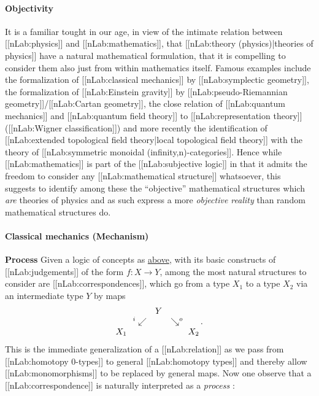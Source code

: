 \documentclass[12pt,titlepage]{article}
\def\mathllap{\mathpalette\mathllapinternal}
\def\mathrlap{\mathpalette\mathrlapinternal}
\def\mathllapinternal#1#2{\llap{$\mathsurround=0pt#1{#2}$}}
\def\mathrlapinternal#1#2{\rlap{$\mathsurround=0pt#1{#2}$}}
\newcommand{\itexarray}[1]{\begin{matrix}#1\end{matrix}}
\theoremstyle{plain}
\theoremstyle{definition}
\theoremstyle{remark}
\begin{document}
\hypertarget{objectivity}{}\paragraph*{{Objectivity}}\label{objectivity}
It is a familiar tought in our age, in view of the intimate relation between [[nLab:physics]] and [[nLab:mathematics]], that [[nLab:theory (physics)|theories of physics]] have a natural mathematical formulation, that it is compelling to consider them also just from within mathematics itself. Famous examples include the formalization of [[nLab:classical mechanics]] by [[nLab:symplectic geometry]], the formalization of [[nLab:Einstein gravity]] by [[nLab:pseudo-Riemannian geometry]]/[[nLab:Cartan geometry]], the close relation of [[nLab:quantum mechanics]] and [[nLab:quantum field theory]] to [[nLab:representation theory]] ([[nLab:Wigner classification]]) and more recently the identification of [[nLab:extended topological field theory|local topological field theory]] with the theory of [[nLab:symmetric monoidal (infinity,n)-categories]].
Hence while [[nLab:mathematics]] is part of the [[nLab:subjective logic]] in that it admits the freedom to consider any [[nLab:mathematical structure]] whatsoever, this suggests to identify among these the ``objective'' mathematical structures which \emph{are} theories of physics and as such express a more \emph{objective reality} than random mathematical structures do.
\hypertarget{classical_mechanics_mechanism}{}\paragraph*{{Classical mechanics (Mechanism)}}\label{classical_mechanics_mechanism}
\textbf{Process}
Given a logic of concepts as \hyperlink{ConceptFormalization}{above}, with its basic constructs of [[nLab:judgements]] of the form $f \colon X \to Y$, among the most natural structures to consider are [[nLab:correspondences]], which go from a type $X_1$ to a type $X_2$ via an intermediate type $Y$ by maps
\begin{displaymath}
\itexarray{
    && Y
    \\
    & {}^{\mathllap{i}}\swarrow && \searrow^{\mathrlap{o}}
    \\
    X_1 && && X_2
  }
  \,.
\end{displaymath}
This is the immediate generalization of a [[nLab:relation]] as we pass from [[nLab:homotopy 0-types]] to general [[nLab:homotopy types]] and thereby allow [[nLab:monomorphisms]] to be replaced by general maps.
Now one observe that a [[nLab:correspondence]] is naturally interpreted as a \emph{process} :
\end{document}

